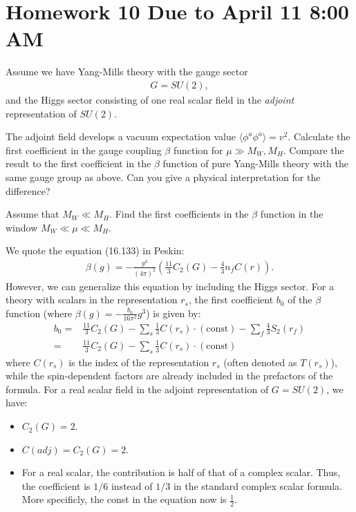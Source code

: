 \section*{Homework 10 Due to April 11 8:00 AM}
Assume we have Yang-Mills theory with the gauge sector
\begin{align}
    G=SU(2),
\end{align}
and the Higgs sector consisting of one real scalar field in the \textit{adjoint} representation of $SU(2)$.

The adjoint field develops a vacuum expectation value $\langle\phi^a\phi^a\rangle=v^2$. Calculate the first coefficient in the gauge coupling $\beta$ function for $\mu\gg M_W, M_H$. Compare the result to the first coefficient in the $\beta$ function of pure Yang-Mills theory with the same gauge group as above. Can you give a physical interpretation for the difference?

Assume that $M_W \ll M_H$. Find the first coefficients in the $\beta$ function in
the window $M_W \ll \mu \ll M_H$.

\answer{}
We quote the equation (16.133) in Peskin:
\begin{align}
\beta(g)=-\frac{g^3}{(4\pi)^2}\left(\frac{11}{3}C_2(G)-\frac{4}{3}n_f C(r)\right).
\end{align}
However, we can generalize this equation by including the Higgs sector. For a theory with scalars in the representation $r_s$, the first coefficient $b_0$ of the $\beta$ function (where $\beta(g) = -\frac{b_0}{16\pi^2}g^3$) is given by:
\begin{align}
b_0 =& \frac{11}{3}C_2(G) - \sum_{s} \frac{1}{3} C(r_s) \cdot (\text{const}) - \sum_{f} \frac{4}{3} S_2(r_f)\\
=&\frac{11}{3}C_2(G) - \sum_{s} \frac{1}{3} C(r_s) \cdot (\text{const})
\end{align}
where $C(r_s)$ is the index of the representation $r_s$ (often denoted as $T(r_s)$), while the spin-dependent factors are already included in the prefactors of the formula. For a real scalar field in the adjoint representation of $G=SU(2)$, we have:
\begin{itemize}
\item $C_2(G) = 2$.
\item $C(adj) = C_2(G) = 2$.
\item For a real scalar, the contribution is half of that of a complex scalar. Thus, the coefficient is $1/6$ instead of $1/3$ in the standard complex scalar formula. More specificly, the const in the equation now is $\frac{1}{2}$.
\end{itemize}

